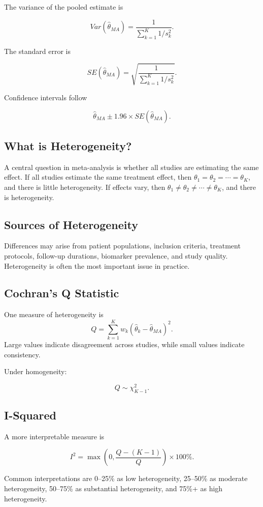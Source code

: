 \documentclass[11pt]{article}
\begin{document}
The variance of the pooled estimate is

\[Var(\hat{\theta}_{MA})=\frac{1}{\sum_{k=1}^{K}1/s_k^2}.\]

The standard error is

\[SE(\hat{\theta}_{MA})=\sqrt{\frac{1}{\sum_{k=1}^{K}1/s_k^2}}.\]

Confidence intervals follow

\[\hat{\theta}_{MA}\pm1.96\times SE(\hat{\theta}_{MA}).\]

\subsection*{What is Heterogeneity?}

A central question in meta-analysis is whether all studies are estimating the same effect.
If all studies estimate the same treatment effect, then $\theta_1=\theta_2=\cdots=\theta_K$, and there is little heterogeneity.
If effects vary, then $\theta_1\neq\theta_2\neq\cdots\neq\theta_K$, and there is heterogeneity.

\subsection*{Sources of Heterogeneity}

Differences may arise from patient populations, inclusion criteria, treatment protocols, follow-up durations, biomarker prevalence, and study quality.
Heterogeneity is often the most important issue in practice.

\subsection*{Cochran's Q Statistic}

One measure of heterogeneity is
\[Q=\sum_{k=1}^{K}w_k(\hat{\theta}_k-\hat{\theta}_{MA})^2.\]
Large values indicate disagreement across studies, while small values indicate consistency.

Under homogeneity:

\[Q\sim\chi^2_{K-1}.\]

\subsection*{I-Squared}

A more interpretable measure is

\[I^2=\max\left(0,\frac{Q-(K-1)}{Q}\right)\times100\%.\]

Common interpretations are 0--25\% as low heterogeneity, 25--50\% as moderate heterogeneity, 50--75\% as substantial heterogeneity, and 75\%+ as high heterogeneity.
\end{document}
